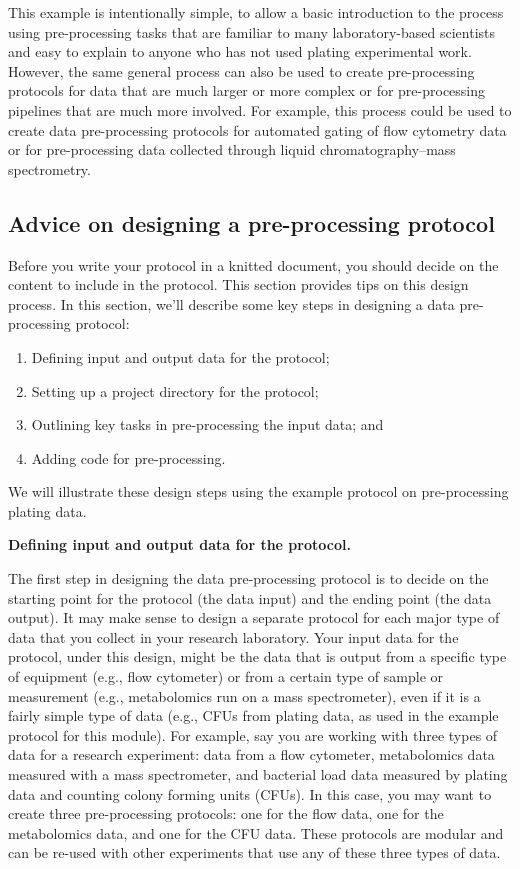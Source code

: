\documentclass[]{tufte-book}
\providecommand{\tightlist}{%
  \setlength{\itemsep}{0pt}\setlength{\parskip}{0pt}}
\begin{document}
This example is intentionally simple, to allow a basic introduction to the
process using pre-processing tasks that are familiar to many laboratory-based
scientists and easy to explain to anyone who has not used plating experimental
work. However, the same general process can also be used to create
pre-processing protocols for data that are much larger or more complex or for
pre-processing pipelines that are much more involved.
For example, this process could be used to create data pre-processing protocols
for automated gating of flow cytometry data or for pre-processing data
collected through liquid chromatography--mass spectrometry.

\hypertarget{advice-on-designing-a-pre-processing-protocol}{%
\subsection{Advice on designing a pre-processing protocol}\label{advice-on-designing-a-pre-processing-protocol}}

Before you write your protocol in a knitted document, you should decide on the
content to include in the protocol. This section provides tips on this design
process. In this section, we'll describe some key steps in designing a
data pre-processing protocol:

\begin{enumerate}
\def\labelenumi{\arabic{enumi}.}
\tightlist
\item
  Defining input and output data for the protocol;
\item
  Setting up a project directory for the protocol;
\item
  Outlining key tasks in pre-processing the input data; and
\item
  Adding code for pre-processing.
\end{enumerate}

We will illustrate these design steps using the example protocol on
pre-processing plating data.

\textbf{Defining input and output data for the protocol.}

The first step in designing the data pre-processing protocol is to decide on the
starting point for the protocol (the data input) and the ending point (the data
output). It may make sense to design a separate protocol for each major type of
data that you collect in your research laboratory. Your input data for the
protocol, under this design, might be the data that is output from a specific
type of equipment (e.g., flow cytometer) or from a certain type of sample or
measurement (e.g., metabolomics run on a mass spectrometer), even if it is a
fairly simple type of data (e.g., CFUs from plating data, as used in the example
protocol for this module). For example, say you are working with three types of
data for a research experiment: data from a flow cytometer, metabolomics data
measured with a mass spectrometer, and bacterial load data measured by plating
data and counting colony forming units (CFUs). In this case, you may want to
create three pre-processing protocols: one for the flow data, one for the
metabolomics data, and one for the CFU data. These protocols are modular and can
be re-used with other experiments that use any of these three types of data.
\end{document}
